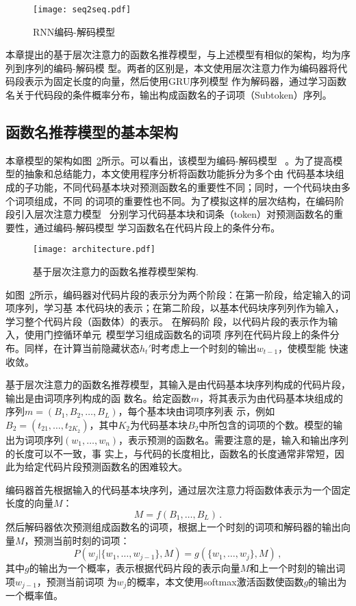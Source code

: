 \begin{figure} [!t]
	\centering
	\texttt{[image: seq2seq.pdf]}
	\caption{RNN编码-解码模型}
	\label{fig:seq2seq}
\end{figure}

本章提出的基于层次注意力的函数名推荐模型，与上述模型有相似的架构，均为序列到序列的编码-解码模
型。两者的区别是，本文使用层次注意力作为编码器将代码段表示为固定长度的向量，然后使用GRU序列模型
作为解码器，通过学习函数名关于代码段的条件概率分布，输出构成函数名的子词项（Subtoken）序列。

\subsection{函数名推荐模型的基本架构}
本章模型的架构如图~\ref{fig:arch}所示。可以看出，该模型为编码-解码模型
~\cite{Kyunghyun2014Learning}。为了提高模型的抽象和总结能力，本文使用程序分析将函数功能拆分为多个由
代码基本块组成的子功能，不同代码基本块对预测函数名的重要性不同；同时，一个代码块由多个词项组成，不同
的词项的重要性也不同。为了模拟这样的层次结构，在编码阶段引入层次注意力模型
~\cite{yang2016hierarchical}分别学习代码基本块和词条（token）对预测函数名的重要性，通过编码-解码模型
学习函数名在代码片段上的条件分布。

\begin{figure} [!t]
	\centering
	\texttt{[image: architecture.pdf]}
	\caption{基于层次注意力的函数名推荐模型架构.}
	\label{fig:arch}
\end{figure}

如图~\ref{fig:arch}所示，编码器对代码片段的表示分为两个阶段：在第一阶段，给定输入的词项序列，学习基
本代码块的表示；在第二阶段，以基本代码块序列列作为输入，学习整个代码片段（函数体）的表示。 在解码阶
段，以代码片段的表示作为输入，使用门控循环单元~\cite{Kyunghyun2014Learning}模型学习组成函数名的词项
序列在代码片段上的条件分布。同样，在计算当前隐藏状态$h_t'$时考虑上一个时刻的输出$w_{t-1}$，使模型能
快速收敛。

基于层次注意力的函数名推荐模型，其输入是由代码基本块序列构成的代码片段，输出是由词项序列构成的函
数名。给定函数$m$，将其表示为由代码基本块组成的序列$m=(B_1,B_2, \dots, B_L)$，每个基本块由词项序列表
示，例如$B_2 = (t_{21}, \dots, t_{2K_2})$，其中$K_2$为代码基本块$B_2$中所包含的词项的个数。模型的输
出为词项序列$(w_1, \dots, w_n)$，表示预测的函数名。需要注意的是，输入和输出序列的长度可以不一致，事
实上，与代码的长度相比，函数名的长度通常非常短，因此为给定代码片段预测函数名的困难较大。

编码器首先根据输入的代码基本块序列，通过层次注意力将函数体表示为一个固定长度的向量$M$：
\begin{equation}
M = f({B_1, \dots, B_L}) \,.
\label{eq:encoder}
\end{equation}
然后解码器依次预测组成函数名的词项，根据上一个时刻的词项和解码器的输出向量$M$，预测当前时刻的词项：
\begin{equation}
P(w_j|\{w_1, \dots, w_{j-1}\}, M) = g(\{w_1, \dots, w_{j}\}, M) \,,
\label{eq:decoder}
\end{equation}
其中$g$的输出为一个概率，表示根据代码片段的表示向量$M$和上一个时刻的输出词项$w_{j-1}$，预测当前词项
为$w_j$的概率，本文使用softmax激活函数使函数$g$的输出为一个概率值。


